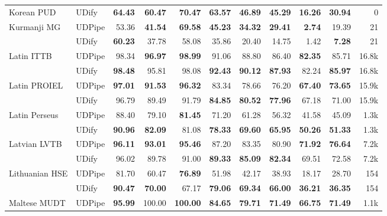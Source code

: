 \documentclass[11pt,a4paper]{article}
\begin{document}
\begin{table*}
\begin{center}
\begin{tabular}{@{}llrrrrrrrrr@{}}
    \addlinespace
    Korean PUD & UDify &  \bf 64.43 &  \bf 60.47 &   \bf 70.47 &  \bf 63.57 &  \bf 46.89 &  \bf 45.29 &  \bf 16.26 &  \bf 30.94 &      0 \\
    \addlinespace
    Kurmanji MG & UDPipe &      53.36 &  \bf 41.54 &   \bf 69.58 &  \bf 45.23 &  \bf 34.32 &  \bf 29.41 &   \bf 2.74 &      19.39 &     21 \\
               & UDify &  \bf 60.23 &      37.78 &       58.08 &      35.86 &      20.40 &      14.75 &       1.42 &   \bf 7.28 &     21 \\
    \addlinespace
    Latin ITTB & UDPipe &      98.34 &  \bf 96.97 &   \bf 98.99 &      91.06 &      88.80 &      86.40 &  \bf 82.35 &      85.71 &  16.8k \\
               & UDify &  \bf 98.48 &      95.81 &       98.08 &  \bf 92.43 &  \bf 90.12 &  \bf 87.93 &      82.24 &  \bf 85.97 &  16.8k \\
    \addlinespace
    Latin PROIEL & UDPipe &  \bf 97.01 &  \bf 91.53 &   \bf 96.32 &      83.34 &      78.66 &      76.20 &  \bf 67.40 &  \bf 73.65 &  15.9k \\
               & UDify &      96.79 &      89.49 &       91.79 &  \bf 84.85 &  \bf 80.52 &  \bf 77.96 &      67.18 &      71.00 &  15.9k \\
    \addlinespace
    Latin Perseus & UDPipe &      88.40 &      79.10 &   \bf 81.45 &      71.20 &      61.28 &      56.32 &      41.58 &      45.09 &   1.3k \\
               & UDify &  \bf 90.96 &  \bf 82.09 &       81.08 &  \bf 78.33 &  \bf 69.60 &  \bf 65.95 &  \bf 50.26 &  \bf 51.33 &   1.3k \\
    \addlinespace
    Latvian LVTB & UDPipe &  \bf 96.11 &  \bf 93.01 &   \bf 95.46 &      87.20 &      83.35 &      80.90 &  \bf 71.92 &  \bf 76.64 &   7.2k \\
               & UDify &      96.02 &      89.78 &       91.00 &  \bf 89.33 &  \bf 85.09 &  \bf 82.34 &      69.51 &      72.58 &   7.2k \\
    \addlinespace
    Lithuanian HSE & UDPipe &      81.70 &      60.47 &   \bf 76.89 &      51.98 &      42.17 &      38.93 &      18.17 &      28.70 &    154 \\
               & UDify &  \bf 90.47 &  \bf 70.00 &       67.17 &  \bf 79.06 &  \bf 69.34 &  \bf 66.00 &  \bf 36.21 &  \bf 36.35 &    154 \\
    \addlinespace
    Maltese MUDT & UDPipe &  \bf 95.99 &     100.00 &  \bf 100.00 &  \bf 84.65 &  \bf 79.71 &  \bf 71.49 &  \bf 66.75 &  \bf 71.49 &   1.1k \\

\end{tabular}
\end{center}
\end{table*}
\end{document}
